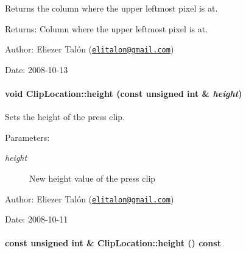 Returns the column where the upper leftmost pixel is at. 

\begin{Desc}
\item[Returns:]Column where the upper leftmost pixel is at.\end{Desc}
\begin{Desc}
\item[Author:]Eliezer Talón (\href{mailto:elitalon@gmail.com}{\tt elitalon@gmail.com}) \end{Desc}
\begin{Desc}
\item[Date:]2008-10-13 \end{Desc}
\hypertarget{class_clip_location_f0e979e989c1cecbca6fe2da92b383f7}{
\paragraph[{height}]{\setlength{\rightskip}{0pt plus 5cm}void ClipLocation::height (const unsigned int \& {\em height})}\hfill}
\label{class_clip_location_f0e979e989c1cecbca6fe2da92b383f7}


Sets the height of the press clip. 

\begin{Desc}
\item[Parameters:]
\begin{description}
\item[{\em height}]New height value of the press clip\end{description}
\end{Desc}
\begin{Desc}
\item[Author:]Eliezer Talón (\href{mailto:elitalon@gmail.com}{\tt elitalon@gmail.com}) \end{Desc}
\begin{Desc}
\item[Date:]2008-10-11 \end{Desc}
\hypertarget{class_clip_location_e18ec2c31e76a983acdbaec9d3bad659}{
\paragraph[{height}]{\setlength{\rightskip}{0pt plus 5cm}const unsigned int \& ClipLocation::height () const}\hfill}
\label{class_clip_location_e18ec2c31e76a983acdbaec9d3bad659}


